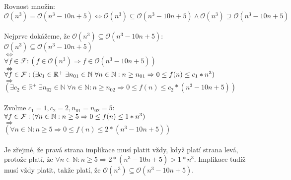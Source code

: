 \documentclass[a4paper,11pt]{article}[24.3.2010]
\begin{document}
\begin{enumerate}
\begin{enumerate}
      Rovnost množin:\\
      $\mathcal{O}(n^3) = \mathcal{O}(n^3 - 10n + 5) \Leftrightarrow \mathcal{O}(n^3) \subseteq \mathcal{O}(n^3 - 10n + 5) \wedge \mathcal{O}(n^3) \supseteq \mathcal{O}(n^3 - 10n + 5)$\\\\
      Nejprve dokážeme, že $\mathcal{O}(n^3) \subseteq \mathcal{O}(n^3 - 10n + 5)$:\\
      $\mathcal{O}(n^3) \subseteq \mathcal{O}(n^3 - 10n + 5)$\\
      $\Leftrightarrow$\\
      $\forall f \in \mathcal{F} : (f \in \mathcal{O}(n^3) \Rightarrow f \in \mathcal{O}(n^3 - 10n + 5))$\\
      $\Leftrightarrow$\\
      $\forall f \in \mathcal{F} : \\ (\exists c_{1} \in \mathbb{R}^+ \hspace{3pt} \exists n_{01} \in \mathbb{N} \hspace{3pt} \forall n \in \mathbb{N} : n \geq n_{01} \Rightarrow 0 \leq f(n) \leq c_{1}*n^3)$\\
      $\Rightarrow$\\
      $(\exists c_{2} \in \mathbb{R}^+ \hspace{3pt} \exists n_{02} \in \mathbb{N} \hspace{3pt} \forall n \in \mathbb{N} : n \geq n_{02} \Rightarrow 0 \leq f(n) \leq c_{2}*(n^3 - 10n + 5))$\\\\
      Zvolme $c_{1}=1, c_{2}=2,n_{01}=n_{02}=5$:\\
      $\forall f \in \mathcal{F} : \\(\forall n \in \mathbb{N} : n \geq 5 \Rightarrow 0 \leq f(n) \leq 1*n^3)$\\
      $\Rightarrow$\\
      $(\forall n \in \mathbb{N} : n \geq 5 \Rightarrow 0 \leq f(n) \leq 2*(n^3 - 10n + 5))$\\\\
      Je zřejmé, že pravá strana implikace musí platit vždy, když platí strana levá, protože platí, že $\forall n \in \mathbb{N} : n \geq 5 \Rightarrow 2*(n^3 - 10n + 5) > 1*n^3$. Implikace tudíž musí vždy platit, takže platí, že $\mathcal{O}(n^3) \subseteq \mathcal{O}(n^3 - 10n + 5)$.\\


\end{enumerate}
\end{enumerate}
\end{document}
